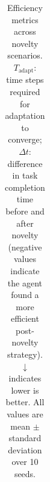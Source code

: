 \begin{table}[t]
\begin{tabular}{l l c c}
\bottomrule
\end{tabular}
\caption[Adaptation efficiency across novelty scenarios]{Efficiency metrics across novelty scenarios. $T_\text{adapt}$: time steps required for adaptation to converge; $\Delta t$: difference in task completion time before and after novelty (negative values indicate the agent found a more efficient post-novelty strategy). $\downarrow$ indicates lower is better. All values are mean $\pm$ standard deviation over 10 seeds.}
\label{tab:ng_efficiency}
\end{table}
